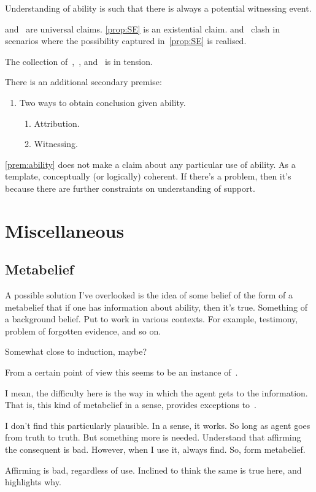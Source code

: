 Understanding of ability is such that there is always a potential witnessing event.

\ESU{} and~\nI{} are universal claims.
\ref{prop:SE} is an existential claim.
\ESU{} and~\nI{} clash in scenarios where the possibility captured in~\ref{prop:SE} is realised.

The collection of~\ESU{},~\nI{}, and~\eA{} is in tension.

There is an additional secondary premise:

\begin{note}
\begin{enumerate}
\item\label{prem:ability} Two ways to obtain conclusion given ability.
  \begin{enumerate}
  \item Attribution.
  \item Witnessing.
  \end{enumerate}
\end{enumerate}

\ref{prem:ability} does not make a claim about any particular use of ability.
As a template, conceptually (or logically) coherent.
If there's a problem, then it's because there are further constraints on understanding of support.
\end{note}

\section{Miscellaneous}
\label{sec:misc}

\subsection{Metabelief}
\label{sec:metabelief}

\begin{note}[Idea]
  A possible solution I've overlooked is the idea of some belief of the form of a metabelief that if one has information about ability, then it's true.
  Something of a background belief.
  Put to work in various contexts.
  For example, testimony, problem of forgotten evidence, and so on.

  Somewhat close to induction, maybe?
\end{note}

\begin{note}[Reduction?]
  From a certain point of view this seems to be an instance of~\nI{}.

  I mean, the difficulty here is the way in which the agent gets to the information.
  That is, this kind of metabelief in a sense, provides exceptions to~\nI{}.

  I don't find this particularly plausible.
  In a sense, it works.
  So long as agent goes from truth to truth.
  But something more is needed.
  Understand that affirming the consequent is bad.
  However, when I use it, always find.
  So, form metabelief.

  Affirming is bad, regardless of use.
  Inclined to think the same is true here, and~\nI{} highlights why.
\end{note}

